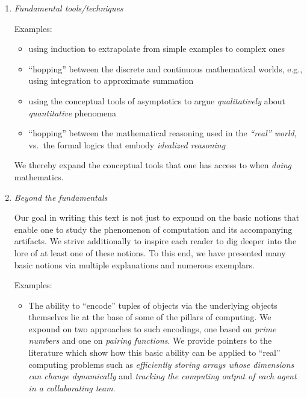 \begin{enumerate}
\medskip\item
{\it Fundamental tools/techniques}

\medskip

{\small\sf Examples:}
\begin{itemize}
\item
using induction to extrapolate from simple examples to complex ones
\medskip\item
``hopping'' between the discrete and continuous mathematical worlds, e.g., using integration to approximate summation
\medskip\item
using the conceptual tools of asymptotics to argue {\em qualitatively} about {\em quantitative} phenomena
\medskip\item
``hopping'' between the mathematical reasoning used in the {\em ``real'' world}, vs.~the formal logics that embody {\em idealized reasoning}
\end{itemize}
We thereby expand the conceptual tools that one has access to when {\em doing} mathematics.

\medskip\item
{\it Beyond the fundamentals}

Our goal in writing this text is not just to expound on the basic notions that enable one to study the phenomenon of computation and its accompanying artifacts.  We strive additionally to inspire each reader to dig deeper into the lore of at least one of these notions.  To this end, we have presented many basic notions via multiple explanations and numerous exemplars.

\medskip

{\small\sf Examples:}
\begin{itemize}
\item
The ability to ``encode'' tuples of objects via the underlying objects themselves lie at the base of some of the pillars of computing.  We expound on two approaches to such encodings, one based on {\em prime numbers} and one on {\em pairing functions}.  We provide pointers to the literature which show how this basic ability can be applied to ``real'' computing problems such as {\em efficiently storing arrays whose dimensions can change dynamically} and {\em tracking the  computing output of each agent in a collaborating team}.


\end{itemize}
\end{enumerate}
